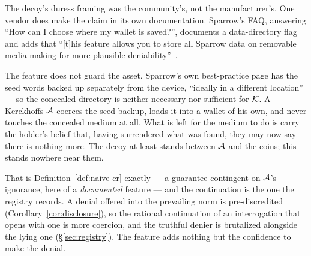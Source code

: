 \begin{remark}\label{rem:hidden-medium}
The decoy's duress framing was the community's, not the manufacturer's. One vendor
does make the claim in its own documentation. Sparrow's FAQ, answering ``How can I
choose where my wallet is saved?'', documents a data-directory flag and adds that
``[t]his feature allows you to store all Sparrow data on removable media making for
more plausible deniability''~\cite{sparrow-faq}.

The feature does not guard the asset. Sparrow's own best-practice page has the seed
words backed up separately from the device, ``ideally in a different
location''~\cite{sparrow-best-practices} --- so the concealed directory is neither
necessary nor sufficient for $\mathcal{K}$. A Kerckhoffs $\mathcal{A}$ coerces the seed
backup, loads it into a wallet of his own, and never touches the concealed medium at
all. What is left for the medium to do is carry the holder's belief that, having
surrendered what was found, they may now say there is nothing more. The decoy at
least stands between $\mathcal{A}$ and the coins; this stands nowhere near them.

That is Definition~\ref{def:naive-cr} exactly --- a guarantee contingent on
$\mathcal{A}$'s ignorance, here of a \emph{documented} feature --- and the continuation
is the one the registry records. A denial offered into the prevailing norm is
pre-discredited (Corollary~\ref{cor:disclosure}), so the rational continuation of an
interrogation that opens with one is more coercion, and the truthful denier is
brutalized alongside the lying one (\S\ref{sec:registry}). The feature adds nothing
but the confidence to make the denial.
\end{remark}

